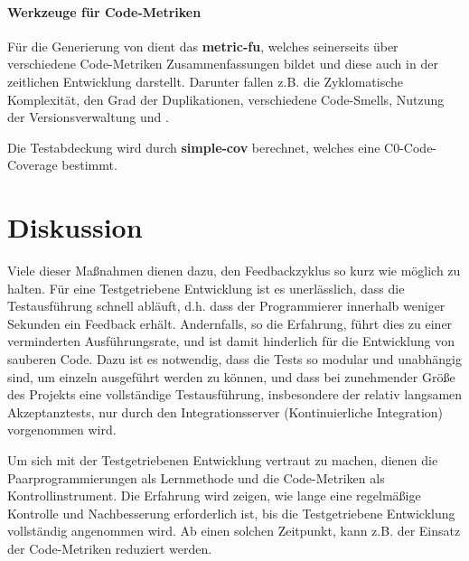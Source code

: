 \paragraph{Werkzeuge für Code-Metriken}  Für die Generierung von  dient das  \textbf{metric-fu}, welches seinerseits über verschiedene Code-Metriken Zusammenfassungen bildet und diese auch in der zeitlichen Entwicklung darstellt. Darunter fallen z.B. die Zyklomatische Komplexität, den Grad der Duplikationen, verschiedene Code-Smells, Nutzung der Versionsverwaltung und .

Die Testabdeckung wird durch \textbf{simple-cov} berechnet, welches eine C0-Code-Coverage bestimmt.


\section{Diskussion}

Viele dieser Maßnahmen dienen dazu, den Feedbackzyklus so kurz wie möglich zu halten. Für eine Testgetriebene Entwicklung ist es unerlässlich, dass die Testausführung schnell abläuft, d.h. dass der Programmierer innerhalb weniger Sekunden ein Feedback erhält. Andernfalls, so die Erfahrung, führt dies zu einer verminderten Ausführungsrate, und ist damit hinderlich für die Entwicklung von sauberen Code. Dazu ist es notwendig, dass die Tests so modular und unabhängig sind, um einzeln ausgeführt werden zu können, und dass bei zunehmender Größe des Projekts eine vollständige Testausführung, insbesondere der relativ langsamen Akzeptanztests, nur durch den Integrationsserver (Kontinuierliche Integration) vorgenommen wird.

Um sich mit der Testgetriebenen Entwicklung vertraut zu machen, dienen die Paarprogrammierungen als Lernmethode und die Code-Metriken als Kontrollinstrument. Die Erfahrung wird zeigen, wie lange eine regelmäßige Kontrolle und Nachbesserung erforderlich ist, bis die Testgetriebene Entwicklung vollständig angenommen wird. Ab einen solchen Zeitpunkt, kann z.B. der Einsatz der Code-Metriken reduziert werden.
